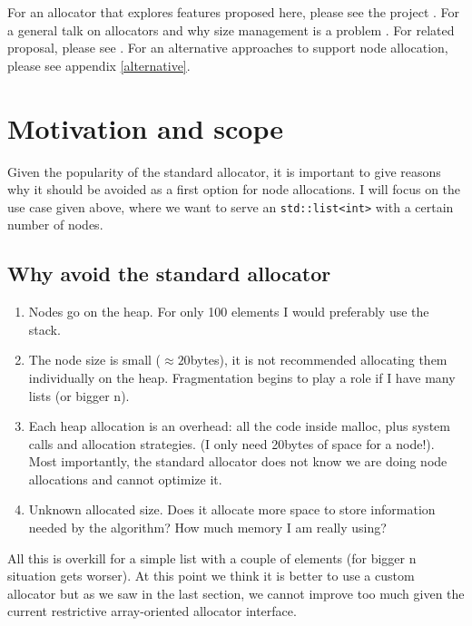 \documentclass[11pt]{article}
\begin{document}
For an allocator that explores features proposed here, please see the
project \cite{rtcpp}. For a general talk on allocators and why size management
is a problem \cite{alexandrescu}. For related proposal, please see
\cite{prop1}.  For an alternative approaches to support node allocation, please
see appendix \ref{alternative}.

\section{Motivation and scope}

Given the popularity of the standard allocator, it is important to give reasons
why it should be avoided as a first option for node allocations. I will focus
on the use case given above, where we want to serve an
\texttt{std::list<int>} with a certain number of nodes.

\subsection{Why avoid the standard allocator}

\begin{enumerate}

\item Nodes go on the heap. For only 100 elements I would preferably
use the stack.

\item The node size is small ($\approx 20$bytes), it is not recommended
allocating them individually on the heap. Fragmentation begins to play a role
if I have many lists (or bigger n).

\item  Each heap allocation is an overhead: all the code inside malloc, plus
system calls and allocation strategies. (I only need 20bytes of space for a
node!). Most importantly, the standard allocator does not
know we are doing node allocations and cannot optimize it.

\item Unknown allocated size. Does it allocate more space to store information
needed by the algorithm? How much memory I am really using?

\end{enumerate}

All this is overkill for a simple list with a couple of elements
(for bigger n situation gets worser). At this point we think it is
better to use a custom allocator but as we saw in the last section,
we cannot improve too much given the current restrictive array-oriented
allocator interface.
\end{document}
